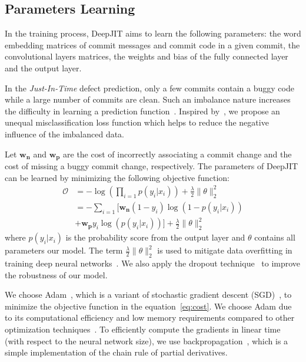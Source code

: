 \subsection{Parameters Learning}
\label{sec:learning_parameters}

In the training process, DeepJIT aims to learn the following parameters: the
word embedding matrices of commit messages and commit code in a given commit, the convolutional layers matrices, the weights and bias of
the fully connected layer and the output layer. 

In the \emph{Just-In-Time} defect prediction, only a few commits contain a buggy code while a large number of commits are clean. Such an imbalance nature increases the difficulty in learning a prediction function~\cite{chawla2004special}. Inspired by~\cite{zhou2006training, kukar1998cost}, we propose an unequal misclassification loss function which helps to reduce the negative influence of the imbalanced data. 

Let $\textbf{w}_\textbf{n}$ and $\textbf{w}_\textbf{p}$ are the cost of incorrectly associating a commit change and the cost of missing a buggy commit change, respectively. The parameters of DeepJIT can be learned by minimizing the following objective function:
\begin{equation} %
\label{eq:cost}
\begin{split}
\mathcal{O} &= -\log\left( \prod_{i=1}^{} p(y_i|x_i) \right) + \frac{\lambda}{2} \|\theta\|_{2}^{2} \\
&= -\sum_{i=1}^{} [ \textbf{w}_\textbf{n} (1 - y_i) \log(1 - p(y_i|x_i)) \\ 
&+ \textbf{w}_\textbf{p} y_i \log (p(y_i|x_i)) ] + \frac{\lambda}{2} \|\theta\|_{2}^{2}
\end{split}
\end{equation}
where $p(y_i|x_i)$ is the probability score from the output layer and $\theta$ contains all parameters our model. The term $\frac{\lambda}{2} \|\theta\|_{2}^{2}$ is used to mitigate data overfitting in training deep neural networks~\cite{caruana2001overfitting}. We also apply the dropout technique~\cite{srivastava2014dropout} to improve the robustness of our model. 

We choose Adam~\cite{kingma2014adam}, which is a variant of stochastic gradient descent (SGD)~\cite{bottou2010large}, to minimize the objective function in the equation~\ref{eq:cost}. We choose Adam due to its computational efficiency and low memory requirements compared to other optimization techniques~\cite{kingma2014adam, anthimopoulos2016lung, arora2018optimization}. To efficiently compute the gradients in linear time (with respect to the neural network size), we use backpropagation~\cite{hagan1994training}, which is a simple implementation of the chain rule of partial derivatives.
